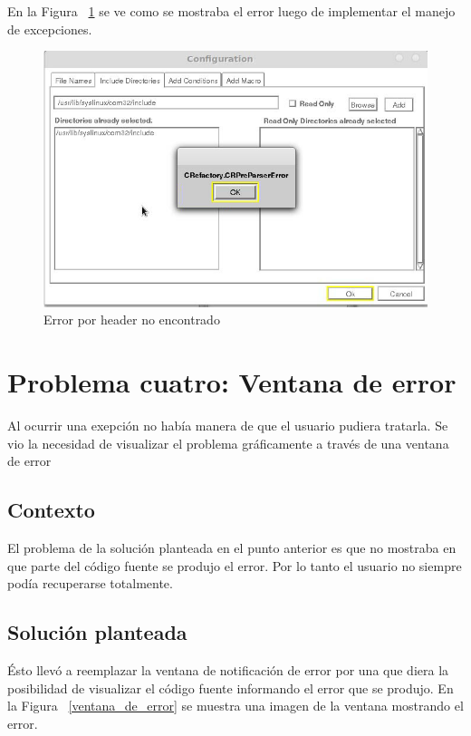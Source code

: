 \documentclass[a4paper,oneside,12pt]{article}
\begin{document}
En la Figura ~\ref{header_no_encontrado} se ve como se mostraba el error luego de implementar el manejo de excepciones.

\begin{figure}[h!]
  \centering
    \includegraphics[scale=0.50]{images/codigo_modificado/error_header_no_encontrado_sin_view_error.jpg}
     \caption{Error por header no encontrado}
     \label{header_no_encontrado}
\end{figure}

\section{Problema cuatro: Ventana de error}

Al ocurrir una exepci\'on no hab\'ia manera de que el usuario pudiera tratarla. Se vio la necesidad de visualizar el problema gr\'aficamente a trav\'es de una ventana de error

\subsection{Contexto}
El problema de la soluci\'on planteada en el punto anterior es que no mostraba en que parte del c\'odigo fuente se produjo el error. Por lo tanto el usuario no siempre pod\'ia recuperarse totalmente.

\subsection{Soluci\'on planteada}
\'Esto llev\'o a reemplazar la ventana de notificaci\'on de error por una que diera la posibilidad de visualizar el c\'odigo fuente informando el error que se produjo. En la Figura ~\ref{ventana_de_error} se muestra una imagen de la ventana mostrando el error.
\end{document}

